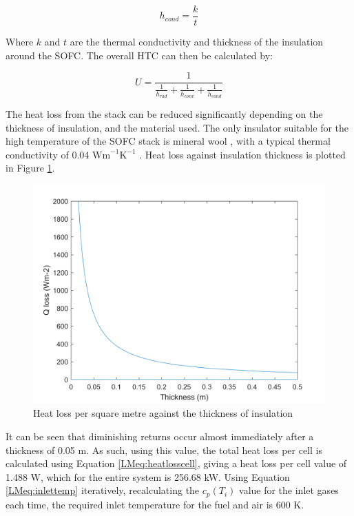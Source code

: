 \documentclass{article}
\begin{document}
\begin{equation}
 h_{cond}=\frac{k}{t}						
  \end{equation}
  
Where $k$ and $t$ are the thermal conductivity and thickness of the insulation around the SOFC. The overall HTC can then be calculated by:

\begin{equation}
 U=  \frac{1}{\frac{1}{h_{rad}} + \frac{1}{h_{conv}} + \frac{1}{h_{cond}} }			
\end{equation}

The heat loss from the stack can be reduced significantly depending on the thickness of insulation, and the material used. The only insulator suitable for the high temperature of the SOFC stack is mineral wool \cite{LM15}, with a typical thermal conductivity of 0.04 $\text{Wm}^{-1}\text{K}^{-1}$ \cite{LM14}. Heat loss against insulation thickness is plotted in Figure \ref{LMfig:insulation}.


\begin{figure}
    \centering
    \includegraphics[scale=0.25]{insulation_thickness.png}
    \caption{Heat loss per square metre against the thickness of insulation}
    \label{LMfig:insulation}
\end{figure}


It can be seen that diminishing returns occur almost immediately after a thickness of 0.05 m. As such, using this value, the total heat loss per cell is calculated using Equation \ref{LMeq:heatlosscell}, giving a heat loss per cell value of 1.488 W, which for the entire system is 256.68 kW. Using Equation \ref{LMeq:inlettemp} iteratively, recalculating the $c_{p}(T_i )$  value for the inlet gases each time, the required inlet temperature for the fuel and air is 600 K.\\ \\ \\ \\
\end{document}
